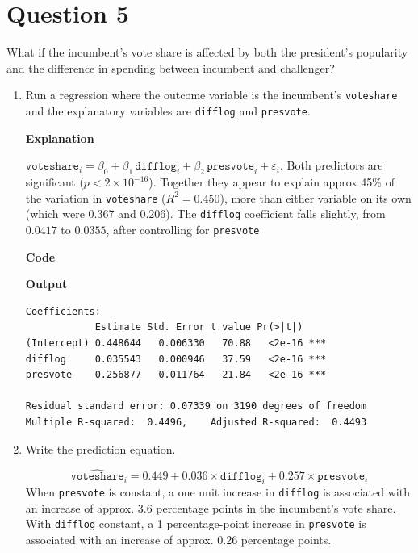 \documentclass[12pt,letterpaper]{article}
\begin{document}
\section*{Question 5}
\noindent What if the incumbent's vote share is affected by both the president's popularity and the difference in spending between incumbent and challenger? 
	\begin{enumerate}
		\item Run a regression where the outcome variable is the incumbent's \texttt{voteshare} and the explanatory variables are \texttt{difflog} and \texttt{presvote}.	\vspace{.5cm}

		\textbf{Explanation}
		\vspace{.5cm}

		$\texttt{voteshare}_i = \beta_0 + \beta_1\,\texttt{difflog}_i + \beta_2\,\texttt{presvote}_i + \varepsilon_i$. Both predictors are significant ($p < 2\times10^{-16}$). Together they appear to explain approx 45\% of the variation in \texttt{voteshare} ($R^2 = 0.450$), more than either variable on its own (which were 0.367 and 0.206). The \texttt{difflog} coefficient falls slightly, from $0.0417$ to $0.0355$, after controlling for \texttt{presvote}
		\vspace{1cm}

		\textbf{Code}
		
		\vspace{1cm}
		\textbf{Output}
		\begin{verbatim}
Coefficients:
            Estimate Std. Error t value Pr(>|t|)    
(Intercept) 0.448644   0.006330   70.88   <2e-16 ***
difflog     0.035543   0.000946   37.59   <2e-16 ***
presvote    0.256877   0.011764   21.84   <2e-16 ***

Residual standard error: 0.07339 on 3190 degrees of freedom
Multiple R-squared:  0.4496,	Adjusted R-squared:  0.4493
		\end{verbatim}

		\item Write the prediction equation.	\vspace{.5cm}

		\[
		\widehat{\texttt{voteshare}}_i = 0.449 + 0.036 \times \texttt{difflog}_i + 0.257 \times \texttt{presvote}_i
		\]
		When \texttt{presvote} is constant, a one unit increase in \texttt{difflog} is associated with an increase of approx. 3.6 percentage points in the incumbent's vote share. With \texttt{difflog} constant, a 1 percentage-point increase in \texttt{presvote} is associated with an increase of approx. 0.26 percentage points.
		\vspace{.5cm}


\end{enumerate}
\end{document}
